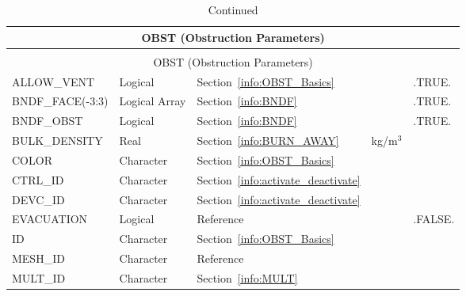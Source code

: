 \documentclass[11pt]{book}
\begin{document}
\begin{longtable}{@{\extracolsep{\fill}}|l|l|l|l|l|}
\caption[Obstruction parameters ({\ct OBST} namelist group)]{For more information see Section~\ref{info:OBST}.}
\label{tbl:OBST} \\
\hline
\multicolumn{5}{|c|}{{\ct OBST} (Obstruction Parameters)} \\
\hline \hline
\endfirsthead
\caption[]{Continued} \\
\hline
\multicolumn{5}{|c|}{{\ct OBST} (Obstruction Parameters)} \\
\hline \hline
\endhead
{\ct ALLOW\_VENT}         & Logical             & Section~\ref{info:OBST_Basics}            &           & {\ct .TRUE.}  \\ \hline
{\ct BNDF\_FACE(-3:3)}    & Logical Array       & Section~\ref{info:BNDF}                   &           & {\ct .TRUE.}  \\ \hline
{\ct BNDF\_OBST}          & Logical             & Section~\ref{info:BNDF}                   &           & {\ct .TRUE.}  \\ \hline
{\ct BULK\_DENSITY}       & Real                & Section~\ref{info:BURN_AWAY}              & kg/m$^3$  &               \\ \hline
{\ct COLOR    }           & Character           & Section~\ref{info:OBST_Basics}            &           &               \\ \hline
{\ct CTRL\_ID }           & Character           & Section~\ref{info:activate_deactivate}    &           &               \\ \hline
{\ct DEVC\_ID }           & Character           & Section~\ref{info:activate_deactivate}    &           &               \\ \hline
{\ct EVACUATION}          & Logical             & Reference~\cite{FDS_Evac_Users_Guide}     &           & {\ct .FALSE.} \\ \hline
{\ct ID }                 & Character           & Section~\ref{info:OBST_Basics}            &           &               \\ \hline
{\ct MESH\_ID}            & Character           & Reference~\cite{FDS_Evac_Users_Guide}     &           &               \\ \hline
{\ct MULT\_ID }           & Character           & Section~\ref{info:MULT}                   &           &               \\ \hline

\end{longtable}
\end{document}
